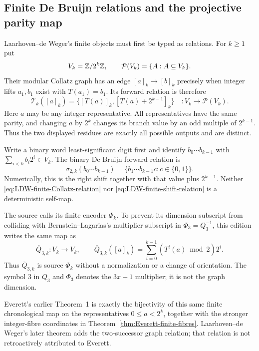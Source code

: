 \subsection{Finite De Bruijn relations and the projective parity map}
\label{subsec:finite-debruijn-relations}

Laarhoven--de Weger's finite objects must first be typed as relations.  For
$k\geq1$ put
\[
 V_k=\mathbb{Z}/2^k\mathbb{Z},
 \qquad
 \mathcal P(V_k)=\{A:A\subseteq V_k\}.
\]
Their modular Collatz graph has an edge $[a]_k\to[b]_k$ precisely when
integer lifts $a_1,b_1$ exist with $T(a_1)=b_1$.  Its forward relation is
therefore
\begin{equation}
\label{eq:LDW-finite-Collatz-relation}
 \mathcal T_k([a]_k)
 =\bigl\{[T(a)]_k,[T(a)+2^{k-1}]_k\bigr\}
 \quad:V_k\longrightarrow\mathcal P(V_k).
\end{equation}
Here $a$ may be any integer representative.  All representatives have the
same parity, and changing $a$ by $2^k$ changes its branch value by an odd
multiple of $2^{k-1}$.  Thus the two displayed residues are exactly all
possible outputs and are distinct.

Write a binary word least-significant digit first and identify
$b_0\cdots b_{k-1}$ with $\sum_{i<k}b_i2^i\in V_k$.  The binary De Bruijn
forward relation is
\begin{equation}
\label{eq:LDW-finite-shift-relation}
 \sigma_{2,k}(b_0\cdots b_{k-1})
 =\{b_1\cdots b_{k-1}c:c\in\{0,1\}\}.
\end{equation}
Numerically, this is the right shift together with that value plus
$2^{k-1}$.  Neither \eqref{eq:LDW-finite-Collatz-relation} nor
\eqref{eq:LDW-finite-shift-relation} is a deterministic self-map.

The source calls its finite encoder $\Phi_k$.  To prevent its dimension
subscript from colliding with Bernstein--Lagarias's multiplier subscript in
$\Phi_3=Q_3^{-1}$, this edition writes the same map as
\begin{equation}
\label{eq:LDW-finite-parity-map}
 \overline Q_{3,k}:V_k\longrightarrow V_k,
 \qquad
 \overline Q_{3,k}([a]_k)
 =\sum_{i=0}^{k-1}(T^i(a)\bmod2)2^i.
\end{equation}
Thus $\overline Q_{3,k}$ is source $\Phi_k$ without a normalization or a
change of orientation.  The symbol $3$ in $Q_3$ and $\Phi_3$ denotes the
$3x+1$ multiplier; it is not the graph dimension.

Everett's earlier Theorem~1 is exactly the bijectivity of this same finite
chronological map on the representatives $0\leq a<2^k$, together with the
stronger integer-fibre coordinates in
Theorem~\ref{thm:Everett-finite-fibres}.  Laarhoven--de Weger's later theorem
adds the two-successor graph relation; that relation is not retroactively
attributed to Everett.

